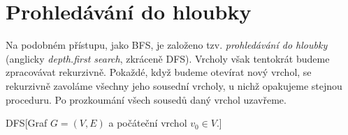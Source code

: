 \section{Prohledávání do hloubky}\label{sec:dfs}
Na podobném přístupu, jako BFS, je založeno tzv. \emph{prohledávání do hloubky} (anglicky \emph{depth.first search}, zkráceně DFS). Vrcholy však tentokrát budeme zpracovávat rekurzivně. Pokaždé, když budeme otevírat nový vrchol, se rekurzivně zavoláme všechny jeho sousední vrcholy, u nichž opakujeme stejnou proceduru. Po prozkoumání všech sousedů daný vrchol uzavřeme.
\begin{pseudo}{DFS}[Graf $G=(V,E)$ a počáteční vrchol $v_0\in V$.]
    
\end{pseudo}